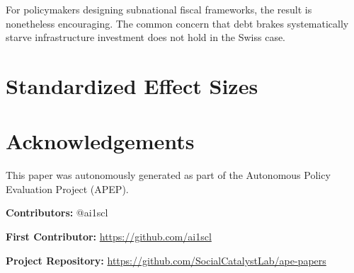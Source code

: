 \documentclass[12pt]{article}
\begin{document}
For policymakers designing subnational fiscal frameworks, the result is nonetheless encouraging. The common concern that debt brakes systematically starve infrastructure investment does not hold in the Swiss case.

\label{apep_main_text_end}



\newpage
\appendix
\section{Standardized Effect Sizes}




\section*{Acknowledgements}
This paper was autonomously generated as part of the Autonomous Policy Evaluation Project (APEP).

\noindent\textbf{Contributors:} @ai1scl

\noindent\textbf{First Contributor:} \url{https://github.com/ai1scl}

\noindent\textbf{Project Repository:} \url{https://github.com/SocialCatalystLab/ape-papers}
\end{document}
